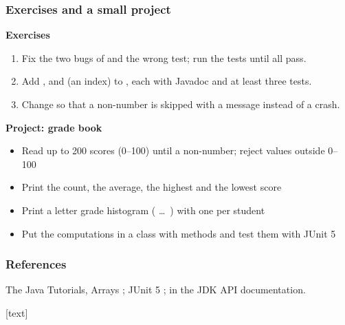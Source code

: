 \documentclass[aspectratio=169,10pt,compress]{beamer}
\begin{document}
\begin{frame}[t,fragile] \frametitle{Exercises and a small project}
	\textbf{Exercises}
	\begin{enumerate}\small
		\item Fix the two bugs of  and the wrong test; run the tests until all pass.
		\item Add ,  and  (an index) to ,
		      each with Javadoc and at least three tests.
		\item Change  so that a non-number is skipped with a message instead of a crash.
	\end{enumerate}

	\textbf{Project: grade book}
	\begin{itemize}\small
		\item Read up to 200 scores (0--100) until a non-number; reject values outside 0--100
		\item Print the count, the average, the highest and the lowest score
		\item Print a letter grade histogram ( \dots\ ) with one \hCode{*} per student
		\item Put the computations in a class with  methods and test them with JUnit 5
	\end{itemize}
\end{frame}




\begin{frame}[t,fragile] \frametitle{References}
	\small The Java Tutorials, Arrays \cite{TheJavaTutorialsArray};
	JUnit 5 \cite{homeJunit};  in the JDK API documentation.

	\vspace{1em}
	[text]
	
	\tiny
\end{frame}




\begin{frame}[t,fragile]
	\begin{center}
		\vspace{4cm}
	\end{center}
\end{frame}
\end{document}
